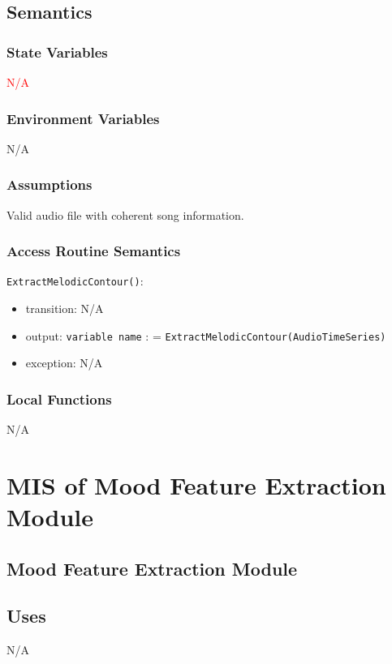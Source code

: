 \documentclass[12pt, titlepage]{article}
\begin{document}
\subsection{Semantics}

\subsubsection{State Variables}
\textcolor{red}{N/A}

\subsubsection{Environment Variables}
N/A

\subsubsection{Assumptions}
Valid audio file with coherent song information.

\subsubsection{Access Routine Semantics}

\noindent \texttt{Extract\textunderscore Melodic\textunderscore Contour()}:
\begin{itemize}
\item transition: N/A 
\item output: \texttt{variable name} : = \texttt{Extract\textunderscore Melodic\textunderscore Contour(Audio\textunderscore Time\textunderscore Series)}
\item exception: N/A
\end{itemize}

\subsubsection{Local Functions}
N/A

\section{MIS of Mood Feature Extraction Module} 

\subsection{Mood Feature Extraction Module}

\subsection{Uses}
N/A
\end{document}
